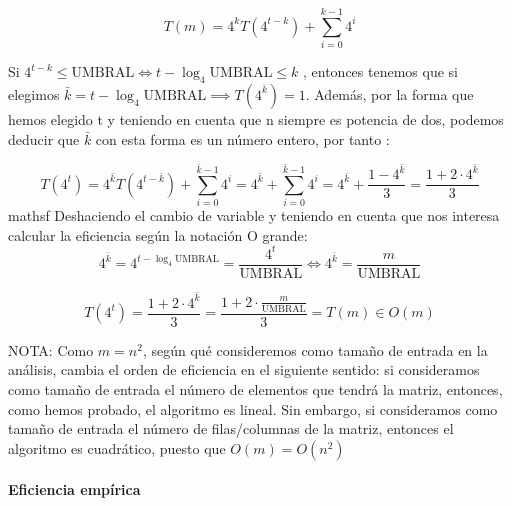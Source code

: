 \documentclass{article}
\newcommand{\myparagraph}[1]{\paragraph{#1}\mbox{}\\}
\begin{document}
    \[
      T\left(m\right)= 4^{k} T\left(4^{t-k}\right) + \sum_{i=0}^{k-1} 4^{i} 
    \]

    Si $ 4^{t-k} \leq \text{UMBRAL} \iff t - \log_{4}{\text{UMBRAL}} \leq k $ , entonces tenemos que si elegimos $\bar{k} = t - \log_{4}{\text{UMBRAL}} \implies T\left(4^{\bar{k}}\right) = 1$. Además, por la forma que hemos elegido t y teniendo en cuenta que n siempre es potencia de dos, podemos deducir que $\bar{k}$ con esta forma es un número entero, por tanto :
    
    \[
       T\left(4^{t}\right) = 4^{\bar{k}} T\left(4^{t-\bar{k}}\right) + \sum_{i=0}^{\bar{k}-1} 4^{i} =
       4^{\bar{k}} + \sum_{i=0}^{\bar{k}-1} 4^{i} =
       4^{\bar{k}} + \frac{1-4^{\bar{k}}}{3} = 
       \frac{1 + 2 \cdot 4^{\bar{k}}}{3} 
    \]
mathsf
    Deshaciendo el cambio de variable y teniendo en cuenta que 
    nos interesa calcular la eficiencia según la notación O grande: \\

    \[
        4^{\bar{k}} = 4^{t - \log_{4}{\text{UMBRAL}}} = 
        \frac{4^{t}}{\text{UMBRAL}} \iff 4^{\bar{k}} = 
        \frac{m}{\text{UMBRAL}}
    \]
    
    \[
        T\left(4^{t}\right) = \frac{1 + 2 \cdot 4^{\bar{k}}}{3} = 
        \frac{1 + 2 \cdot \frac{m}{\text{UMBRAL}}}{3} = T\left(m\right) \in O(m)
    \]

    NOTA: Como $m = n^{2}$, según qué consideremos 
    como tamaño de entrada en la análisis, cambia el orden de 
    eficiencia en el siguiente sentido: si consideramos como tamaño de entrada el número de elementos que tendrá la matriz, entonces, como hemos probado, el algoritmo es lineal. Sin embargo, si consideramos como tamaño de entrada el número de filas/columnas de la matriz, 
    entonces el algoritmo es cuadrático, puesto que $ O(m) = O(n^{2})$
    
\myparagraph{Eficiencia empírica}
\end{document}
